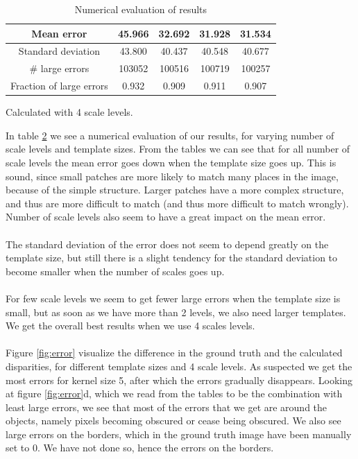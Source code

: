\documentclass[12pt,a4paper,oneside,final]{article}
\begin{document}
\begin{table}[H]
\begin{subtable}{1\textwidth}
\begin{table}[H]
\begin{subtable}{1\textwidth}
\begin{tabular}{c||c|c|c|c}
				Mean error &45.966&32.692&31.928&31.534\\\hline
				Standard deviation &43.800&40.437&40.548&40.677\\\hline
				\# large errors &103052&100516&100719&100257\\\hline
				Fraction of large errors &0.932&0.909&0.911&0.907\\\hline
			\end{tabular}
			\caption{Calculated with 4 scale levels.}
		\end{subtable}
		\caption{Numerical evaluation of results}
		\label{tab:numeval}
	\end{table}
	In table \ref{tab:numeval} we see a numerical evaluation of our results, for varying number of scale levels and template sizes. From the tables we can see that for all number of scale levels the mean error goes down when the template size goes up. This is sound, since small patches are more likely to match many places in the image, because of the simple structure. Larger patches have a more complex structure, and thus are more difficult to match (and thus more difficult to match wrongly). Number of scale levels also seem to have a great impact on the mean error.\\\\
	The standard deviation of the error does not seem to depend greatly on the template size, but still there is a slight tendency for the standard deviation to become smaller when the number of scales goes up.\\\\
	For few scale levels we seem to get fewer large errors when the template size is small, but as soon as we have more than 2 levels, we also need larger templates. We get the overall best results when we use 4 scales levels. \\\\
	Figure \ref{fig:error} visualize the difference in the ground truth and the calculated disparities, for different template sizes and 4 scale levels. As suspected we get the most errors for kernel size 5, after which the errors gradually disappears. Looking at figure \ref{fig:error}d, which we read from the tables to be the combination with least large errors, we see that most of the errors that we get are around the objects, namely pixels becoming obscured or cease being obscured. We also see large errors on the borders, which in the ground truth image have been manually set to 0. We have not done so, hence the errors on the borders.
	

\end{subtable}
\end{table}
\end{document}
